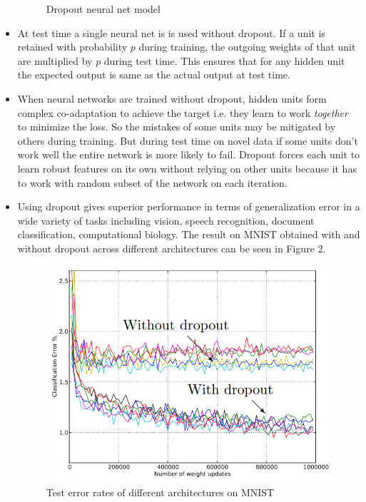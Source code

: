 \documentclass{article}
\begin{document}
\begin{itemize}
\begin{figure}[H]
        \caption{Dropout neural net model}
        \label{fig:Figure 1}
    \end{figure}
    \item At test time a single neural net is is used without dropout. If a unit is retained with probability $p$ during training, the outgoing weights of that unit are multiplied by $p$ during test time. This ensures that for any hidden unit the expected output is same as the actual output at test time. 
    \item When neural networks are trained without dropout, hidden units form complex co-adaptation to achieve the target i.e. they learn to work \textit{together} to minimize the loss. So the mistakes of some units may be mitigated by others during training. But during test time on novel data if some units don't work well the entire network is more likely to fail. Dropout forces each unit to learn robust features on its own without relying on other units because it has to work with random subset of the network on each iteration. 
    \item Using dropout gives superior performance in terms of generalization error in a wide variety of tasks including vision, speech recognition, document classification, computational biology. The result on MNIST obtained with and without dropout across different architectures can be seen in Figure 2.  
    \begin{figure}[H]
        \centering
        \includegraphics[scale=0.6]{performance_mnist.png}
        \caption{Test error rates of different architectures on MNIST}
        \label{fig:Figure 2}
    \end{figure}

\end{itemize}
\end{document}
